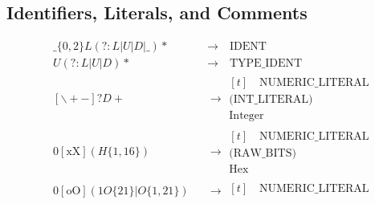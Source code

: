 \documentclass[]{article}
\begin{document}
\subsection{Identifiers, Literals, and Comments}
\begin{align}
    &\_\{0, 2\}L(?:L|U|D|\_)*                                                                &&\to \quad\text{IDENT}                 \\
    &U(?:L|U|D)*                                                                             &&\to \quad\text{TYPE\_IDENT}           \\
    &[\backslash+-]?D+                                                                       &&\to \begin{aligned}[t]
                                                                                                   \quad\text{NUMERIC\_LITERAL}      \\
                                                                                                   \text{(INT\_LITERAL)}             \\
                                                                                                   \text{Integer}
                                                                                                   \end{aligned}                     \\
    &\text{0}[\text{xX}](H\{1,16\})                                                          &&\to \begin{aligned}[t]
                                                                                                   \quad\text{NUMERIC\_LITERAL}      \\
                                                                                                   \text{(RAW\_BITS)}                \\
                                                                                                   \text{Hex}
                                                                                                   \end{aligned}                     \\
    &\text{0}[\text{oO}](1O\{21\}|O\{1,21\})                                                 &&\to \begin{aligned}[t]
                                                                                                   \quad\text{NUMERIC\_LITERAL}      \\

\end{aligned}
\end{align}
\end{document}
